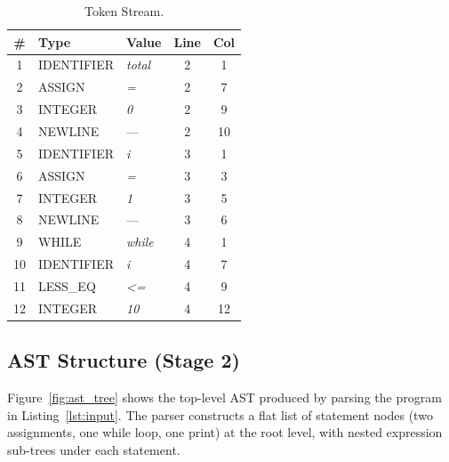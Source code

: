 \documentclass[conference]{IEEEtran}
\begin{document}
\begin{table}[t]
\caption{Token Stream.}
\label{tab:tokens}
\centering
\renewcommand{\arraystretch}{1.15}
\small
\begin{tabular}{@{} c l l c c @{}}
\toprule
\textbf{\#} & \textbf{Type} & \textbf{Value} &
\textbf{Line} & \textbf{Col} \\
\midrule
1  & IDENTIFIER & \textit{total}  & 2 & 1 \\
2  & ASSIGN     & \textit{=}      & 2 & 7 \\
3  & INTEGER    & \textit{0}      & 2 & 9 \\
4  & NEWLINE    & ---             & 2 & 10 \\
5  & IDENTIFIER & \textit{i}      & 3 & 1 \\
6  & ASSIGN     & \textit{=}      & 3 & 3 \\
7  & INTEGER    & \textit{1}      & 3 & 5 \\
8  & NEWLINE    & ---             & 3 & 6 \\
9  & WHILE      & \textit{while}  & 4 & 1 \\
10 & IDENTIFIER & \textit{i}      & 4 & 7 \\
11 & LESS\_EQ   & \textit{<=}     & 4 & 9 \\
12 & INTEGER    & \textit{10}     & 4 & 12 \\
\bottomrule
\end{tabular}
\end{table}

\subsection{AST Structure (Stage 2)}

Figure~\ref{fig:ast_tree} shows the top-level AST produced by
parsing the program in Listing~\ref{lst:input}. The parser
constructs a flat list of statement nodes (two assignments, one
while loop, one print) at the root level, with nested expression
sub-trees under each statement.
\end{document}

